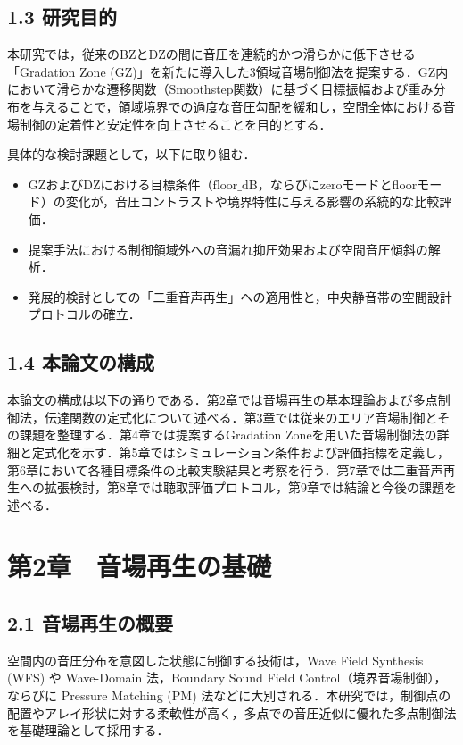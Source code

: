 \documentclass[11pt, a4paper]{article}
\begin{document}
\subsection{1.3 研究目的}
本研究では，従来のBZとDZの間に音圧を連続的かつ滑らかに低下させる「Gradation Zone (GZ)」を新たに導入した3領域音場制御法を提案する．GZ内において滑らかな遷移関数（Smoothstep関数）に基づく目標振幅および重み分布を与えることで，領域境界での過度な音圧勾配を緩和し，空間全体における音場制御の定着性と安定性を向上させることを目的とする．

具体的な検討課題として，以下に取り組む．
\begin{itemize}
    \item GZおよびDZにおける目標条件（$\mathrm{floor\_dB}$，ならびにzeroモードとfloorモード）の変化が，音圧コントラストや境界特性に与える影響の系統的な比較評価．
    \item 提案手法における制御領域外への音漏れ抑圧効果および空間音圧傾斜の解析．
    \item 発展的検討としての「二重音声再生」への適用性と，中央静音帯の空間設計プロトコルの確立．
\end{itemize}

\subsection{1.4 本論文の構成}
本論文の構成は以下の通りである．第2章では音場再生の基本理論および多点制御法，伝達関数の定式化について述べる．第3章では従来のエリア音場制御とその課題を整理する．第4章では提案するGradation Zoneを用いた音場制御法の詳細と定式化を示す．第5章ではシミュレーション条件および評価指標を定義し，第6章において各種目標条件の比較実験結果と考察を行う．第7章では二重音声再生への拡張検討，第8章では聴取評価プロトコル，第9章では結論と今後の課題を述べる．

\section{第2章　音場再生の基礎}

\subsection{2.1 音場再生の概要}
空間内の音圧分布を意図した状態に制御する技術は，Wave Field Synthesis (WFS) や Wave-Domain 法，Boundary Sound Field Control（境界音場制御），ならびに Pressure Matching (PM) 法などに大別される．本研究では，制御点の配置やアレイ形状に対する柔軟性が高く，多点での音圧近似に優れた多点制御法を基礎理論として採用する．
\end{document}
